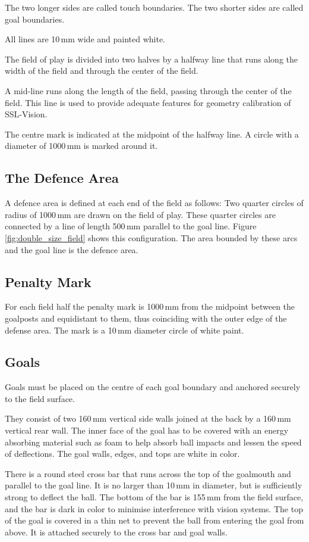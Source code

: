 The two longer sides are called touch boundaries.
The two shorter sides are called goal boundaries.

All lines are 10\,mm wide and painted white.

The field of play is divided into two halves by a halfway line that runs
along the width of the field and through the center of the field.

A mid-line runs along the length of the field, passing through the center
  of the field. This line is used to provide adequate features for geometry
calibration of SSL-Vision.

The centre mark is indicated at the midpoint of the halfway line.
A circle with a diameter of 1000\,mm is marked around it.

\subsection{The Defence Area}

A defence area is defined at each end of the field as
follows:
Two quarter circles of radius of 1000\,mm
are drawn on the field of play. These quarter circles are connected by a line of
length 500\,mm parallel to the goal line. Figure \ref{fig:double_size_field}
shows this configuration.
The area bounded by these arcs and the goal line is
the defence area.


\subsection{Penalty Mark}
For each field half the penalty mark is
1000\,mm from the midpoint between the goalposts and equidistant to them, thus
coinciding with the outer edge of the defense area.
The mark is a 10\,mm diameter circle of white paint.

\subsection{Goals}
Goals must be placed on the centre of each goal boundary and anchored
securely to the field surface.

They consist of two 160\,mm vertical side walls joined at the back by a 160\,mm
vertical rear wall. The inner face of the goal has to be covered with an energy
absorbing material such as foam to help absorb ball impacts and lessen the speed
of deflections.
The goal walls, edges, and tops are white in color.

There is a round steel cross bar that runs across the top of the goalmouth and
parallel to the goal line. It is no larger than 10\,mm in diameter, but is
sufficiently strong to deflect the ball. The bottom of the bar is 155\,mm from
the field surface, and the bar is dark in color to minimise interference with
vision systems. The top of the goal is covered in a thin net to prevent the ball
from entering the goal from above. It is attached securely to the cross bar and
goal walls.

